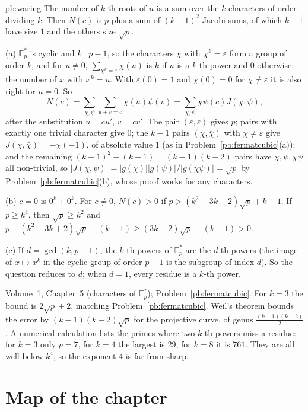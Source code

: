 \begin{solution}{pb:waring}
\idea The number of $k$-th roots of $u$ is a sum over the $k$ characters of order dividing $k$. Then $N(c)$ is $p$ plus a sum of
$(k-1)^2$ Jacobi sums, of which $k-1$ have size $1$ and the others size $\sqrt p$.

\writeup (a) $\mathbb F_p^*$ is cyclic and $k\mid p-1$, so the characters $\chi$ with $\chi^k=\varepsilon$ form a group of order $k$,
and for $u\ne0$, $\sum_{\chi^k=\varepsilon}\chi(u)$ is $k$ if $u$ is a $k$-th power and $0$ otherwise: the number of $x$ with $x^k=u$.
With $\varepsilon(0)=1$ and $\chi(0)=0$ for $\chi\ne\varepsilon$ it is also right for $u=0$. So
\[
N(c)=\sum_{\chi,\psi}\sum_{u+v=c}\chi(u)\psi(v)=\sum_{\chi,\psi}\chi\psi(c)J(\chi,\psi),
\]
after the substitution $u=cu'$, $v=cv'$. The pair $(\varepsilon,\varepsilon)$ gives $p$; pairs with exactly one trivial character
give $0$; the $k-1$ pairs $(\chi,\bar\chi)$ with $\chi\ne\varepsilon$ give $J(\chi,\bar\chi)=-\chi(-1)$, of absolute value $1$ (as in
Problem~\ref{pb:fermatcubic}(a)); and the remaining $(k-1)^2-(k-1)=(k-1)(k-2)$ pairs have $\chi,\psi,\chi\psi$ all non-trivial,
so $|J(\chi,\psi)|=|g(\chi)||g(\psi)|/|g(\chi\psi)|=\sqrt p$ by Problem~\ref{pb:fermatcubic}(b), whose proof works for any characters.

(b) $c=0$ is $0^k+0^k$. For $c\ne0$, $N(c)>0$ if $p>(k^2-3k+2)\sqrt p+k-1$. If $p\ge k^4$, then $\sqrt p\ge k^2$ and
$p-(k^2-3k+2)\sqrt p-(k-1)\ge(3k-2)\sqrt p-(k-1)>0$.

(c) If $d=\gcd(k,p-1)$, the $k$-th powers of $\mathbb F_p^*$ are the $d$-th powers (the image of $x\mapsto x^k$ in the cyclic group
of order $p-1$ is the subgroup of index $d$). So the question reduces to $d$; when $d=1$, every residue is a $k$-th power.

\tools Volume~1, Chapter~5 (characters of $\mathbb F_p^*$); Problem~\ref{pb:fermatcubic}.
\leads For $k=3$ the bound is $2\sqrt p+2$, matching Problem~\ref{pb:fermatcubic}. Weil's theorem bounds the error by
$(k-1)(k-2)\sqrt p$ for the projective curve, of genus $\frac{(k-1)(k-2)}2$. A numerical calculation lists the primes where two $k$-th powers
miss a residue: for $k=3$ only $p=7$, for $k=4$ the largest is $29$, for $k=8$ it is $761$. They are all well below $k^4$, so the
exponent $4$ is far from sharp.
\end{solution}

\section*{Map of the chapter}

